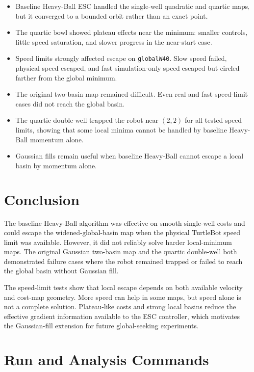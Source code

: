 \documentclass[11pt]{article}
\begin{document}
\begin{itemize}
  \item Baseline Heavy-Ball ESC handled the single-well quadratic and quartic
        maps, but it converged to a bounded orbit rather than an exact point.
  \item The quartic bowl showed plateau effects near the minimum: smaller
        controls, little speed saturation, and slower progress in the near-start
        case.
  \item Speed limits strongly affected escape on \texttt{globalW40}. Slow speed
        failed, physical speed escaped, and fast simulation-only speed escaped
        but circled farther from the global minimum.
  \item The original two-basin map remained difficult. Even real and fast
        speed-limit cases did not reach the global basin.
  \item The quartic double-well trapped the robot near $(2,2)$ for all tested
        speed limits, showing that some local minima cannot be handled by
        baseline Heavy-Ball momentum alone.
  \item Gaussian fills remain useful when baseline Heavy-Ball cannot escape a
        local basin by momentum alone.
\end{itemize}

\section{Conclusion}

The baseline Heavy-Ball algorithm was effective on smooth single-well costs and
could escape the widened-global-basin map when the physical TurtleBot speed
limit was available. However, it did not reliably solve harder local-minimum
maps. The original Gaussian two-basin map and the quartic double-well both
demonstrated failure cases where the robot remained trapped or failed to reach
the global basin without Gaussian fill.

The speed-limit tests show that local escape depends on both available velocity
and cost-map geometry. More speed can help in some maps, but speed alone is not
a complete solution. Plateau-like costs and strong local basins reduce the
effective gradient information available to the ESC controller, which motivates
the Gaussian-fill extension for future global-seeking experiments.

\appendix
\section{Run and Analysis Commands}
\end{document}
